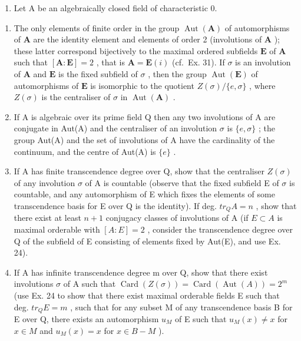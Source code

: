 \begin{enumerate}
\def\labelenumi{\arabic{enumi})}
\setcounter{enumi}{31}
\tightlist
\item
  Let A be an algebraically closed field of characteristic 0.
\end{enumerate}

\begin{enumerate}
\def\labelenumi{\alph{enumi})}
\item
  The only elements of finite order in the group \(\operatorname{Aut}(\mathbf{A})\) of automorphisms of \(\mathbf{A}\) are the identity element and elements of order 2 (involutions of \(\mathbf{A}\) ); these latter correspond bijectively to the maximal ordered subfields \(\mathbf{E}\) of \(\mathbf{A}\) such that \([\mathbf{A}:\mathbf{E}] = 2\) , that is \(\mathbf{A} = \mathbf{E}(i)\) (cf.~Ex. 31). If \(\sigma\) is an involution of \(\mathbf{A}\) and \(\mathbf{E}\) is the fixed subfield of \(\sigma\) , then the group \(\operatorname{Aut}(\mathbf{E})\) of automorphisms of \(\mathbf{E}\) is isomorphic to the quotient \(Z(\sigma) / \{e, \sigma\}\) , where \(Z(\sigma)\) is the centraliser of \(\sigma\) in \(\operatorname{Aut}(\mathbf{A})\) .
\item
  If A is algebraic over its prime field Q then any two involutions of A are conjugate in Aut(A) and the centraliser of an involution \(\sigma\) is \(\{e, \sigma\}\) ; the group Aut(A) and the set of involutions of A have the cardinality of the continuum, and the centre of Aut(A) is \(\{e\}\) .
\item
  If A has finite transcendence degree over Q, show that the centraliser \(Z(\sigma)\) of any involution \(\sigma\) of A is countable (observe that the fixed subfield E of \(\sigma\) is countable, and any automorphism of E which fixes the elements of some transcendence basis for E over Q is the identity). If deg. \(tr_{Q}A = n\) , show that there exist at least \(n + 1\) conjugacy classes of involutions of A (if \(E \subset A\) is maximal orderable with \([A : E] = 2\) , consider the transcendence degree over Q of the subfield of E consisting of elements fixed by Aut(E), and use Ex. 24).
\item
  If A has infinite transcendence degree m over Q, show that there exist involutions \(\sigma\) of A such that \(\operatorname{Card}(Z(\sigma)) = \operatorname{Card}(\operatorname{Aut}(A)) = 2^{m}\) (use Ex. 24 to show that there exist maximal orderable fields E such that deg. \(tr_{Q}E = m\) , such that for any subset M of any transcendence basis B for E over Q, there exists an automorphism \(u_{M}\) of E such that \(u_{M}(x) \neq x\) for \(x \in M\) and \(u_{M}(x) = x\) for \(x \in B - M\) ).

\end{enumerate}
